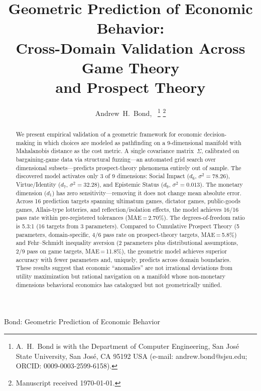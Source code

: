 \documentclass[journal]{IEEEtran}
\begin{document}
\title{Geometric Prediction of Economic Behavior:\\Cross-Domain Validation Across Game Theory\\and Prospect Theory}

\author{Andrew~H.~Bond,~%
\thanks{A.~H.~Bond is with the Department of Computer Engineering, San Jos\'{e} State University, San Jos\'{e}, CA 95192 USA (e-mail: andrew.bond@sjsu.edu; ORCID: 0009-0003-2599-6158).}%
\thanks{Manuscript received \today.}}

%
{Bond: Geometric Prediction of Economic Behavior}

\maketitle

\begin{abstract}
We present empirical validation of a geometric framework for economic decision-making in which choices are modeled as pathfinding on a 9-dimensional manifold with Mahalanobis distance as the cost metric.
A single covariance matrix~$\Sigma$, calibrated on bargaining-game data via structural fuzzing---an automated grid search over dimensional subsets---predicts prospect-theory phenomena entirely out of sample.
The discovered model activates only 3 of 9 dimensions: Social Impact ($d_6$, $\sigma^2=78.26$), Virtue/Identity ($d_7$, $\sigma^2=32.28$), and Epistemic Status ($d_9$, $\sigma^2=0.013$).
The monetary dimension ($d_1$) has zero sensitivity---removing it does not change mean absolute error.
Across 16 prediction targets spanning ultimatum games, dictator games, public-goods games, Allais-type lotteries, and reflection/isolation effects, the model achieves 16/16 pass rate within pre-registered tolerances (MAE\,=\,2.70\%).
The degrees-of-freedom ratio is 5.3:1 (16 targets from 3 parameters).
Compared to Cumulative Prospect Theory (5 parameters, domain-specific, 4/6 pass rate on prospect-theory targets, MAE\,=\,5.8\%) and Fehr--Schmidt inequality aversion (2 parameters plus distributional assumptions, 2/9 pass on game targets, MAE\,=\,11.8\%), the geometric model achieves superior accuracy with fewer parameters and, uniquely, predicts across domain boundaries.
These results suggest that economic ``anomalies'' are not irrational deviations from utility maximization but rational navigation on a manifold whose non-monetary dimensions behavioral economics has catalogued but not geometrically unified.
\end{abstract}
\end{document}
